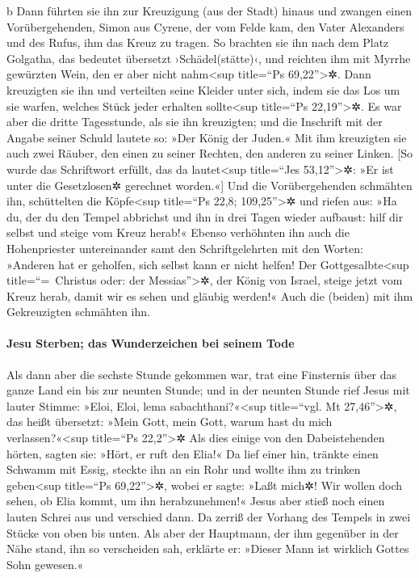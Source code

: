 b Dann führten sie ihn zur Kreuzigung (aus der Stadt) hinaus
 und zwangen einen Vorübergehenden, Simon aus Cyrene, der
vom Felde kam, den Vater Alexanders und des Rufus, ihm das Kreuz zu
tragen.  So brachten sie ihn nach dem Platz Golgatha, das
bedeutet übersetzt ›Schädel(stätte)‹,  und reichten ihm
mit Myrrhe gewürzten Wein, den er aber nicht nahm\textless sup
title=``Ps 69,22''\textgreater✲.  Dann kreuzigten sie ihn
und verteilten seine Kleider unter sich, indem sie das Los um sie
warfen, welches Stück jeder erhalten sollte\textless sup title=``Ps
22,19''\textgreater✲.  Es war aber die dritte
Tagesstunde, als sie ihn kreuzigten;  und die Inschrift
mit der Angabe seiner Schuld lautete so: »Der König der Juden.«
 Mit ihm kreuzigten sie auch zwei Räuber, den einen zu
seiner Rechten, den anderen zu seiner Linken.  {[}So
wurde das Schriftwort erfüllt, das da lautet\textless sup title=``Jes
53,12''\textgreater✲: »Er ist unter die Gesetzlosen✲ gerechnet
worden.«{]}  Und die Vorübergehenden schmähten ihn,
schüttelten die Köpfe\textless sup title=``Ps 22,8;
109,25''\textgreater✲ und riefen aus: »Ha du, der du den Tempel
abbrichst und ihn in drei Tagen wieder aufbaust:  hilf
dir selbst und steige vom Kreuz herab!«  Ebenso
verhöhnten ihn auch die Hohenpriester untereinander samt den
Schriftgelehrten mit den Worten: »Anderen hat er geholfen, sich selbst
kann er nicht helfen!  Der Gottgesalbte\textless sup
title=``=~Christus oder: der Messias''\textgreater✲, der König von
Israel, steige jetzt vom Kreuz herab, damit wir es sehen und gläubig
werden!« Auch die (beiden) mit ihm Gekreuzigten schmähten ihn.

\hypertarget{jesu-sterben-das-wunderzeichen-bei-seinem-tode}{%
\paragraph{Jesu Sterben; das Wunderzeichen bei seinem
Tode}\label{jesu-sterben-das-wunderzeichen-bei-seinem-tode}}

 Als dann aber die sechste Stunde gekommen war, trat eine
Finsternis über das ganze Land ein bis zur neunten Stunde;
 und in der neunten Stunde rief Jesus mit lauter Stimme:
»Eloi, Eloi, lema sabachthani?«\textless sup title=``vgl. Mt
27,46''\textgreater✲, das heißt übersetzt: »Mein Gott, mein Gott, warum
hast du mich verlassen?«\textless sup title=``Ps 22,2''\textgreater✲
 Als dies einige von den Dabeistehenden hörten, sagten
sie: »Hört, er ruft den Elia!«  Da lief einer hin,
tränkte einen Schwamm mit Essig, steckte ihn an ein Rohr und wollte ihm
zu trinken geben\textless sup title=``Ps 69,22''\textgreater✲, wobei er
sagte: »Laßt mich✲! Wir wollen doch sehen, ob Elia kommt, um ihn
herabzunehmen!«  Jesus aber stieß noch einen lauten
Schrei aus und verschied dann.  Da zerriß der Vorhang des
Tempels in zwei Stücke von oben bis unten.  Als aber der
Hauptmann, der ihm gegenüber in der Nähe stand, ihn so verscheiden sah,
erklärte er: »Dieser Mann ist wirklich Gottes Sohn gewesen.«


